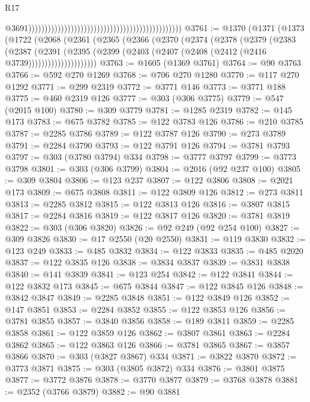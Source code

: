 \begin{lexlean}{R17}
\begin{coremodule}
{{{{{{{{{{{{{{{{{{{{{{{{{{{{{{{{{{{{{{{{{{{{{{{{{{{{{{{{{{{{{{{{{{{{{{{{{{{{{{{{{{{{{{{{{{{{{{{{{{{{{{{{{{{                                                                                                  @3691)))))))))))))))))))))))))))))))))))))))))))))))
@3761 := @1370
    (@1371
      (@1373
        (@1722
          (@2068
            (@2361
              (@2365
                (@2366
                  (@2370
                    (@2374
                      (@2378
                        (@2379
                          (@2383
                            (@2387
                              (@2391
                                (@2395
                                  (@2399
                                    (@2403 (@2407 (@2408 (@2412 (@2416 @3739)))))))))))))))))))))
@3763 := @1605 (@1369 @3761)
@3764 := @90 @3763
@3766 := @592 @270 @1269
@3768 := @706 @270 @1280
@3770 := @117 @270 @1292
@3771 := @299 @2319
@3772 := @3771 @146
@3773 := @3771 @188
@3775 := @460 @2319 @126
@3777 := @303 (@306 @3775)
@3779 := @547 (@2015 @100)
@3780 := @309 @3779
@3781 := @1285 @2319
@3782 := @145 @173
@3783 := @675 @3782
@3785 := @122 @3783 @126
@3786 := @210 @3785
@3787 := @2285 @3786
@3789 := @122 @3787 @126
@3790 := @273 @3789
@3791 := @2284 @3790
@3793 := @122 @3791 @126
@3794 := @3781 @3793
@3797 := @303 (@3780 @3794) @334
@3798 := @3777 @3797
@3799 := @3773 @3798
@3801 := @303 (@306 @3799)
@3804 := @2016 (@92 @237 @100)
@3805 := @309 @3804
@3806 := @123 @237
@3807 := @122 @3806
@3808 := @2021 @173
@3809 := @675 @3808
@3811 := @122 @3809 @126
@3812 := @273 @3811
@3813 := @2285 @3812
@3815 := @122 @3813 @126
@3816 := @3807 @3815
@3817 := @2284 @3816
@3819 := @122 @3817 @126
@3820 := @3781 @3819
@3822 := @303 (@306 @3820)
@3826 := @92 @249 (@92 @254 @100)
@3827 := @309 @3826
@3830 := @17 @2550 (@20 @2550)
@3831 := @119 @3830
@3832 := @123 @249
@3833 := @485 @3832
@3834 := @122 @3833
@3835 := @485 @2020
@3837 := @122 @3835 @126
@3838 := @3834 @3837
@3839 := @3831 @3838
@3840 := @141 @3839
@3841 := @123 @254
@3842 := @122 @3841
@3844 := @122 @3832 @173
@3845 := @675 @3844
@3847 := @122 @3845 @126
@3848 := @3842 @3847
@3849 := @2285 @3848
@3851 := @122 @3849 @126
@3852 := @147 @3851
@3853 := @2284 @3852
@3855 := @122 @3853 @126
@3856 := @3781 @3855
@3857 := @3840 @3856
@3858 := @189 @3811
@3859 := @2285 @3858
@3861 := @122 @3859 @126
@3862 := @3807 @3861
@3863 := @2284 @3862
@3865 := @122 @3863 @126
@3866 := @3781 @3865
@3867 := @3857 @3866
@3870 := @303 (@3827 @3867) @334
@3871 := @3822 @3870
@3872 := @3773 @3871
@3875 := @303 (@3805 @3872) @334
@3876 := @3801 @3875
@3877 := @3772 @3876
@3878 := @3770 @3877
@3879 := @3768 @3878
@3881 := @2352 (@3766 @3879)
@3882 := @90 @3881
}}}}}}}}}}}}}}}}}}}}}}}}}}}}}}}}}}}}}}}}}}}}}}}}}}}}}}}}}}}}}}}}}}}}}}}}}}}}}}}}}}}}}}}}}}}}}}}}}}}}}}}}}}}
\end{coremodule}
\end{lexlean}
